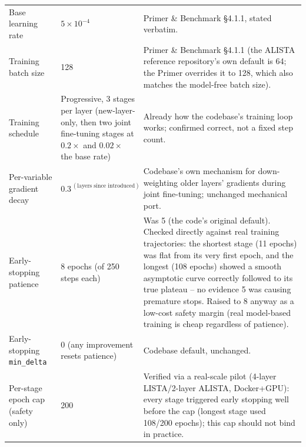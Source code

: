 \begin{longtable}{@{} l l p{7.6cm} @{}}
\addlinespace
\multicolumn{3}{@{}l}{\textbf{Model-based (LISTA / ALISTA) -- training}} \\
\midrule
Base learning rate & $5\times10^{-4}$ & Primer \& Benchmark \S4.1.1, stated verbatim. \\
Training batch size & 128 & Primer \& Benchmark \S4.1.1 (the ALISTA reference repository's own default is 64; the Primer overrides it to 128, which also matches the model-free batch size). \\
Training schedule & Progressive, 3 stages per layer (new-layer-only, then two joint fine-tuning stages at $0.2\times$ and $0.02\times$ the base rate) & Already how the codebase's training loop works; confirmed correct, not a fixed step count. \\
Per-variable gradient decay & $0.3^{\,(\text{layers since introduced})}$ & Codebase's own mechanism for down-weighting older layers' gradients during joint fine-tuning; unchanged mechanical port. \\
Early-stopping patience & 8 epochs (of 250 steps each) & Was 5 (the code's original default). Checked directly against real training trajectories: the shortest stage (11 epochs) was flat from its very first epoch, and the longest (108 epochs) showed a smooth asymptotic curve correctly followed to its true plateau -- no evidence 5 was causing premature stops. Raised to 8 anyway as a low-cost safety margin (real model-based training is cheap regardless of patience). \\
Early-stopping \texttt{min\_delta} & 0 (any improvement resets patience) & Codebase default, unchanged. \\
Per-stage epoch cap (safety only) & 200 & Verified via a real-scale pilot (4-layer LISTA/2-layer ALISTA, Docker+GPU): every stage triggered early stopping well before the cap (longest stage used 108/200 epochs); this cap should not bind in practice. \\


\end{longtable}
